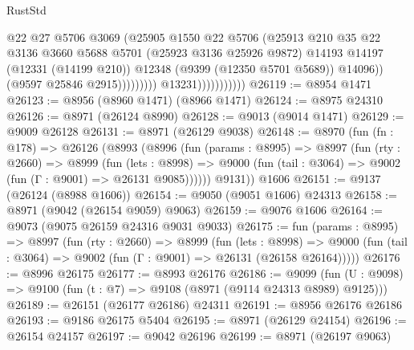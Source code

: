 \begin{lexlean}{RustStd}
\begin{coremodule}
                                          @22
                                          @27
                                          @5706
                                          @3069
                                          (@25905
                                            @1550
                                            @22
                                            @5706
                                            (@25913
                                              @210
                                              @35
                                              @22
                                              @3136
                                              @3660
                                              @5688
                                              @5701
                                              (@25923 @3136 @25926 @9872)
                                              @14193
                                              @14197
                                              (@12331 (@14199 @210))
                                              @12348
                                              (@9399 (@12350 @5701 @5689))
                                              @14096))
                                          (@9597 @25846 @2915)))))))))
                          @13231)))))))))))
@26119 := @8954 @1471
@26123 := @8956 (@8960 @1471) (@8966 @1471)
@26124 := @8975 @24310
@26126 := @8971 (@26124 @8990)
@26128 := @9013 (@9014 @1471)
@26129 := @9009 @26128
@26131 := @8971 (@26129 @9038)
@26148 := @8970
    (fun (fn : @178) =>
    @26126
      (@8993
        (@8996
          (fun (params : @8995) =>
          @8997
            (fun (rty : @2660) =>
            @8999
              (fun (lets : @8998) =>
              @9000 (fun (tail : @3064) => @9002 (fun (Γ : @9001) => @26131 @9085))))))
        @9131))
    @1606
@26151 := @9137 (@26124 (@8988 @1606))
@26154 := @9050 (@9051 @1606) @24313
@26158 := @8971 (@9042 (@26154 @9059) @9063)
@26159 := @9076 @1606
@26164 := @9073 (@9075 @26159 @24316 @9031 @9033)
@26175 := fun (params : @8995) =>
  @8997
    (fun (rty : @2660) =>
    @8999
      (fun (lets : @8998) =>
      @9000 (fun (tail : @3064) => @9002 (fun (Γ : @9001) => @26131 (@26158 @26164)))))
@26176 := @8996 @26175
@26177 := @8993 @26176
@26186 := @9099
    (fun (U : @9098) => @9100 (fun (t : @7) => @9108 (@8971 (@9114 @24313 @8989) @9125)))
@26189 := @26151 (@26177 @26186) @24311
@26191 := @8956 @26176 @26186
@26193 := @9186 @26175 @5404
@26195 := @8971 (@26129 @24154)
@26196 := @26154 @24157
@26197 := @9042 @26196
@26199 := @8971 (@26197 @9063)

\end{coremodule}
\end{lexlean}
